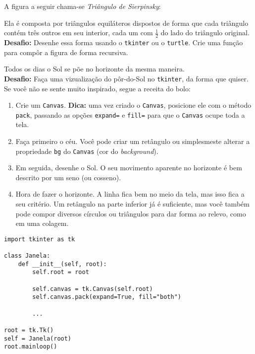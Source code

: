 \documentclass[12pt]{article}
\begin{document}
	A figura a seguir chama-se \emph{Triângulo de Sierpinsky}:
	

	Ela é composta por triângulos equiláteros dispostos de forma que cada triângulo contém três outros em seu interior, cada um com $\frac{1}{2}$ do lado do triângulo original.\\
	
	\textbf{Desafio:} Desenhe essa forma usando o \texttt{tkinter} ou o \texttt{turtle}. Crie uma função para compôr a figura de forma recursiva.
	
	
	Todos os dias o Sol se põe no horizonte da mesma maneira.\\
	
	\textbf{Desafio:} Faça uma vizualização do pôr-do-Sol no \texttt{tkinter}, da forma que quiser. Se você não se sente muito inspirado, segue a receita do bolo:
	
	\begin{enumerate}
		\item Crie um \texttt{Canvas}. \textbf{Dica:} uma vez criado o \texttt{Canvas}, posicione ele com o método \texttt{pack}, passando as opções \texttt{expand=} e \texttt{fill=} para que o \texttt{Canvas} ocupe toda a tela.
		\item Faça primeiro o céu. Você pode criar um retângulo ou simplesmeste alterar a propriedade \texttt{bg} do \texttt{Canvas} (cor do \textit{background}).
		
		\item Em seguida, desenhe o Sol. O seu movimento aparente no horizonte é bem descrito por um seno (ou cosseno).
		
		\item Hora de fazer o horizonte. A linha fica bem no meio da tela, mas isso fica a seu critério. Um retângulo na parte inferior já é suficiente, mas você também pode compor diversos círculos ou triângulos para dar forma ao relevo, como em uma colagem.
		
	\end{enumerate}

	\begin{lstlisting}
import tkinter as tk

class Janela:
	def __init__(self, root):
		self.root = root
		
		self.canvas = tk.Canvas(self.root)
		self.canvas.pack(expand=True, fill="both")
		
		...
		
root = tk.Tk()
self = Janela(root)
root.mainloop()
	\end{lstlisting}
\end{document}
